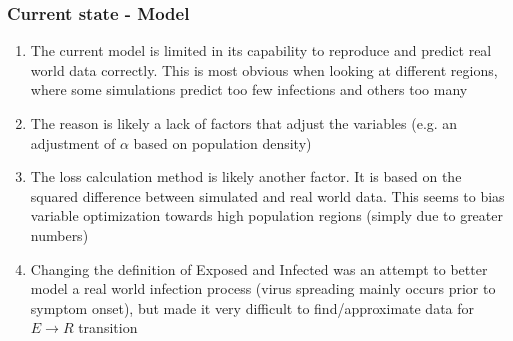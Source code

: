 \documentclass{beamer}
\begin{document}
\begin{frame}
	\frametitle{Current state - Model}
	\label{sec:StateModel}
	\begin{enumerate}[$\bullet$]
		\item The current model is limited in its capability to reproduce and predict real world data correctly. This is most obvious when looking at
			different regions, where some simulations predict too few infections and others too many
		\item The reason is likely a lack of factors that adjust the variables (e.g. an adjustment of $\alpha$ based on population density)
		\item The loss calculation method is likely another factor. It is based on the squared difference between simulated
			and real world data. This seems to bias variable optimization towards high population regions (simply due to greater numbers)
		\item Changing the definition of Exposed and Infected was an attempt to better model a real world infection process (virus spreading mainly
			occurs prior to symptom onset), but made it very difficult to find/approximate data for $E\rightarrow R$ transition
	\end{enumerate}
\end{frame}

\end{document}
